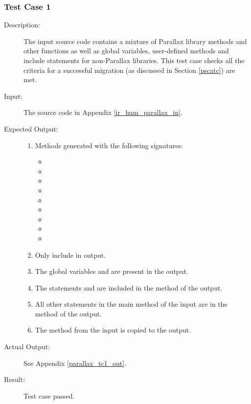\documentclass{UoYCSproject}
\begin{document}
\subsubsection{Test Case 1} \label{parallax_tc1}
\begin{description}
\item[Description:] The input source code contains a mixture of Parallax library methods and other functions as well as global variables, user-defined methods and include statements for non-Parallax libraries. This test case checks all the criteria for a successful migration (as discussed in Section \ref{pscatc}) are met.
\item[Input:] The source code in Appendix \ref{ir_hum_parallax_in}.
\item[Expected Output:] 
\begin{enumerate}
\item Methods generated with the following signatures:
\begin{itemize}
\item {}
\item {}
\item {}
\item {}
\item {}
\item {}
\item {}
\item {}
\item {}
\end{itemize}
\item Only  include in output.
\item The global variables    and  are present in the output.
\item The statements   and  are included in the  method of the output. 
\item All other statements in the main method of the input are in the  method of the output. 
\item The  method from the input is copied to the output.
\end{enumerate}
\item[Actual Output:] See Appendix \ref{parallax_tc1_out}.
\item[Result:] Test case passed.
\end{description}
\end{document}
